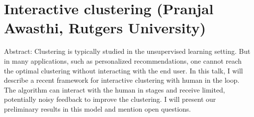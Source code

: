 \section{Interactive clustering (Pranjal Awasthi, Rutgers University)}

Abstract: Clustering is typically studied in the unsupervised learning setting. But in many applications, such as personalized recommendations, one cannot reach the optimal clustering without interacting with the end user. In this talk, I will describe a recent framework for interactive clustering with human in the loop. The algorithm can interact with the human in stages and receive limited, potentially noisy feedback to improve the clustering. I will present our preliminary results in this model and mention open questions.